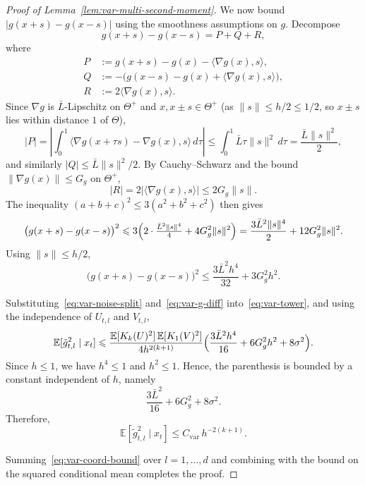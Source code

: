 \documentclass{article}
\renewcommand{\leq}{\leqslant}
\renewcommand{\le}{\leqslant}
\theoremstyle{definition}
\begin{document}
\begin{proof}[Proof of Lemma~\ref{lem:var-multi-second-moment}]
We now bound $|g(x+s)-g(x-s)|$ using the smoothness assumptions on 
$g$. Decompose 
\begin{equation*}
g(x+s)-g(x-s)=P+Q+R,
\end{equation*}
where 
\begin{align*}
P&:= g(x+s)-g(x)-\langle\nabla g(x),s\rangle, \\
Q&:= -\bigl(g(x-s)-g(x)+\langle\nabla g(x),s\rangle\bigr), \\
R&:= 2\langle\nabla g(x),s\rangle.
\end{align*}
Since $\nabla g$ is $\bar{L}$-Lipschitz on $\Theta^+$ and 
$x,x\pm s\in\Theta^+$ (as $\|s\|\leq h/2\leq 1/2$, so $x\pm s$ lies 
within distance $1$ of $\Theta$),
$$
|P|=\left|\int_0^1\langle\nabla g(x+\tau s)-\nabla g(x),s\rangle
\,d\tau\right|
\leq\int_0^1 \bar{L}\tau\|s\|^2\,d\tau
=\frac{\bar{L}\|s\|^2}{2},
$$
and similarly $|Q|\leq\bar{L}\|s\|^2/2$. By Cauchy--Schwarz and the 
bound $\|\nabla g(x)\|\leq G_g$ on $\Theta^+$,
$$
|R|=2|\langle\nabla g(x),s\rangle|\leq 2G_g\|s\|.
$$
The inequality $(a+b+c)^2\leq 3(a^2+b^2+c^2)$ then gives
$$
\bigl(g(x+s)-g(x-s)\bigr)^2
\leq 3\Bigl(2\cdot\tfrac{\bar{L}^2\|s\|^4}{4}+4G_g^2\|s\|^2\Bigr)
=\frac{3\bar{L}^2\|s\|^4}{2}+12G_g^2\|s\|^2.
$$
Using $\|s\|\leq h/2$,
\begin{equation}
\label{eq:var-g-diff}
\bigl(g(x+s)-g(x-s)\bigr)^2
\leq\frac{3\bar{L}^2 h^4}{32}+3G_g^2 h^2.
\end{equation}

Substituting~\eqref{eq:var-noise-split} 
and~\eqref{eq:var-g-diff} into~\eqref{eq:var-tower}, and using the 
independence of $U_{t,l}$ and $V_{t,l}$,
\begin{equation*}
\mathbb{E}[\tilde{g}_{t,l}^2\mid x_t]
\leq\frac{\mathbb{E}[K_k(U)^2]\,\mathbb{E}[K_1(V)^2]}{4h^{2(k+1)}}
\Bigl(\frac{3\bar{L}^2 h^4}{16}+6G_g^2 h^2+8\sigma^2\Bigr).
\end{equation*}
Since $h \le 1$, we have $h^4 \le 1$ and $h^2 \le 1$. Hence, the
parenthesis is bounded by a constant independent of $h$, namely
\[
\frac{3\bar{L}^2}{16}+6G_g^2+8\sigma^2 .
\]
Therefore,
\begin{equation}
\label{eq:var-coord-bound}
\mathbb{E}[\tilde{g}_{t,l}^2\mid x_t]
\leq C_{\mathrm{var}}\,h^{-2(k+1)}.
\end{equation}

Summing~\eqref{eq:var-coord-bound} over $l=1,\dots,d$ and combining 
with the bound on the squared conditional mean completes the proof.
\end{proof}
\end{document}
